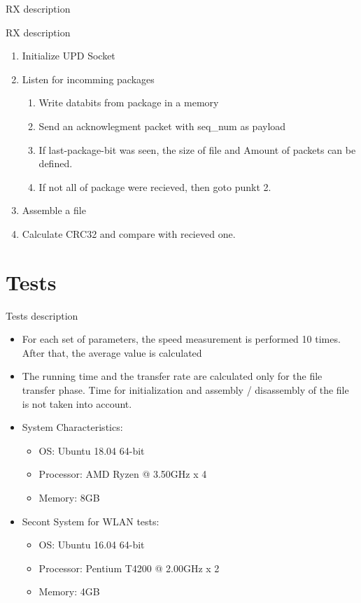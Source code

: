 \documentclass[10pt]{beamer}
\begin{document}
\begin{frame}[fragile]{RX description}
	\begin{block}{RX description}
		\begin{enumerate}
		\item Initialize UPD Socket
		\item Listen for incomming packages
		\begin{enumerate}
			\item Write databits from package in a memory
			\item Send an acknowlegment packet with seq\_num as payload
			\item If last-package-bit was seen, the size of file and Amount of packets can be defined.
			\item If not all of package were recieved, then goto punkt 2.
		\end{enumerate}
		\item Assemble a file
		\item Calculate CRC32 and compare with recieved one.
		\end{enumerate}
	\end{block}
\end{frame}

\section{Tests}


\begin{frame}[fragile]{Tests description}
  \begin{itemize}
  	\footnotesize 	
    \item{} For each set of parameters, the speed measurement is performed 10 times. After that, the average value is calculated
    \item{} The running time and the transfer rate are calculated only for the file transfer phase. Time for initialization and assembly / disassembly of the file is not taken into account.
    \item{} System Characteristics: 
	  \begin{itemize}
	    \item{} OS: Ubuntu 18.04 64-bit
	    \item{} Processor: AMD Ryzen @ 3.50GHz x 4
	    \item{} Memory: 8GB 
	  \end{itemize}
    \item{} Secont System for WLAN tests: 
	  \begin{itemize}
	    \item{} OS: Ubuntu 16.04 64-bit
	    \item{} Processor: Pentium T4200 @ 2.00GHz x 2
	    \item{} Memory: 4GB 
	  \end{itemize}
  \end{itemize}
\end{frame}
\end{document}
